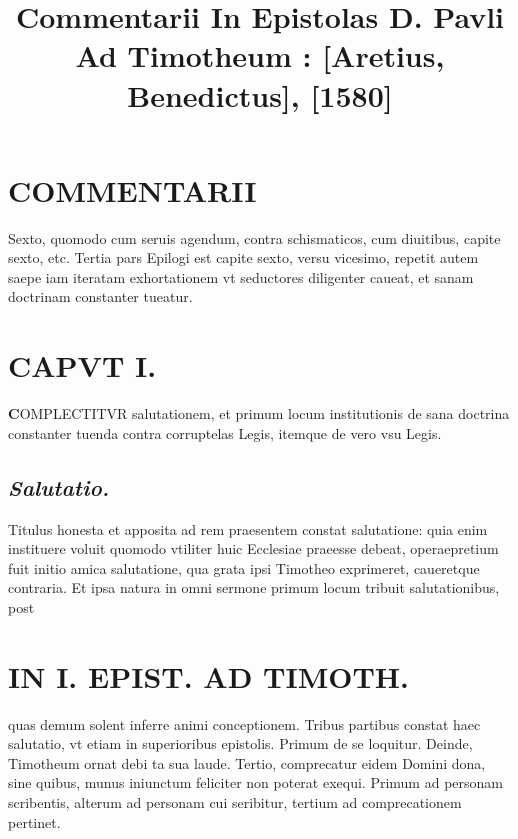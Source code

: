 \documentclass{article}
\begin{document}
\date{}
        \title{Commentarii In Epistolas D. Pavli Ad Timotheum : [Aretius, Benedictus], [1580]}
\maketitle
\tableofcontents
\clearpage
\begin{pages} 
\beginnumbering
        
\section*{COMMENTARII }
\marginpar{[ p.8 ]}\pstart Sexto, quomodo cum seruis agendum, contra schismaticos, cum diuitibus, capite sexto, etc.  \pend\pstart Tertia pars Epilogi est capite sexto, versu vicesimo, repetit autem saepe iam iteratam exhortationem vt seductores diligenter caueat, et sanam doctrinam constanter tueatur.  \pend
\section{CAPVT I.}\pstart \huge\textbf{C}\normalsize OMPLECTITVR salutationem, et primum locum institutionis de sana doctrina constanter tuenda contra corruptelas Legis, itemque de vero vsu Legis.  \pend
{}
{}
\subsection*{\textit{Salutatio. }}\pstart Titulus honesta et apposita ad rem praesentem constat salutatione: quia enim instituere voluit quomodo vtiliter huic Ecclesiae praeesse debeat, operaepretium fuit initio amica salutatione, qua grata ipsi Timotheo exprimeret, caueretque contraria. Et ipsa natura in omni sermone primum locum tribuit salutationibus, post  \pend
\section*{IN I. EPIST. AD TIMOTH. }
\marginpar{[ p.9 ]}\pstart quas demum solent inferre animi conceptionem.  \pend\pstart Tribus partibus constat haec salutatio, vt etiam in superioribus epistolis. Primum de se loquitur. Deinde, Timotheum ornat debi ta sua laude. Tertio, comprecatur eidem Domini dona, sine quibus, munus iniunctum feliciter non poterat exequi. Primum ad personam scribentis, alterum ad personam cui seribitur, tertium ad comprecationem pertinet.  \pend
{}
{}

\end{pages}
\end{document}
